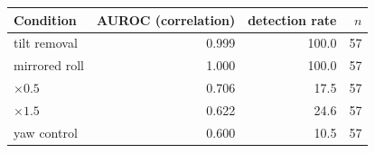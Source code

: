 \begin{tabular}{lrrr}
\toprule
Condition & AUROC (correlation) & detection rate & $n$ \\
\midrule
tilt removal & 0.999 & 100.0 & 57 \\
mirrored roll & 1.000 & 100.0 & 57 \\
$\times 0.5$ & 0.706 & 17.5 & 57 \\
$\times 1.5$ & 0.622 & 24.6 & 57 \\
yaw control & 0.600 & 10.5 & 57 \\
\bottomrule
\end{tabular}
